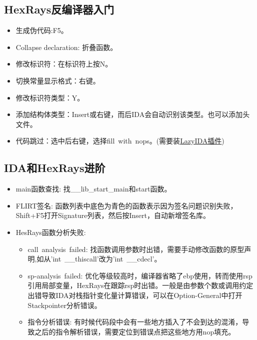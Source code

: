 \subsection{HexRays反编译器入门}
\begin{itemize}
    \item 生成伪代码:F5。
    \item Collapse declaration: 折叠函数。
    \item 修改标识符：在标识符上按N。
    \item 切换常量显示格式：右键。
    \item 修改标识符类型：Y。
    \item 添加结构体类型：Insert或右键，而后IDA会自动识别该类型。也可以添加头文件。
    \item 代码跳过：选中后右键，选择fill\ with\ nops。(需要装\href{https://github.com/L4ys/LazyIDA}{LazyIDA插件})
\end{itemize}

\subsection{IDA和HexRays进阶}
\begin{itemize}
    \item main函数查找: 找\_\_lib\_start\_main和start函数。
    \item FLIRT签名: 函数列表中底色为青色的函数表示因为签名问题识别失败，Shift+F5打开Signature列表，然后按Insert，自动新增签名库。
    \item HesRays函数分析失败:
    \begin{itemize}
        \item call\ analysis\ failed: 找函数调用参数时出错，需要手动修改函数的原型声明,如从'int\ \_\_thiscall'改为'int\ \_\_cdecl'。
        \item sp-analysis\ failed: 优化等级较高时，编译器省略了ebp使用，转而使用rsp引用局部变量，HexRays在跟踪rsp时出错。一般是由参数个数或调用约定出错导致IDA对栈指针变化量计算错误，可以在Option-General中打开Stackpointer分析错误。
        \item 指令分析错误: 有时候代码段中会有一些地方插入了不会到达的混淆，导致之后的指令解析错误，需要定位到错误点把这些地方用nop填充。
    \end{itemize}  
\end{itemize}
